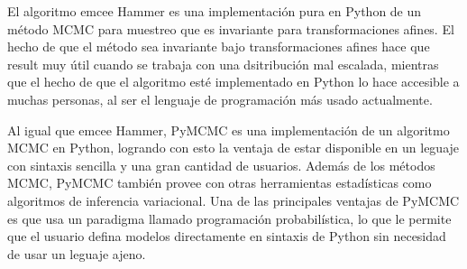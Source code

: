 \documentclass{article}
\begin{document}
\begin{enumerate}
    El algoritmo emcee Hammer es una implementación pura en Python de un método MCMC para 
    muestreo que es invariante para transformaciones afines. El hecho de que el método
    sea invariante bajo transformaciones afines hace que result muy útil cuando
    se trabaja con una dsitribución mal escalada, mientras que el hecho de que el
    algoritmo esté implementado en Python lo hace accesible a muchas personas, al ser
    el lenguaje de programación más usado actualmente.

    Al igual que emcee Hammer, PyMCMC es una implementación de un algoritmo MCMC en 
    Python, logrando con esto la ventaja de estar disponible en un leguaje con sintaxis
    sencilla y una gran cantidad de usuarios. Además de los métodos MCMC, PyMCMC también
    provee con otras herramientas estadísticas como algoritmos de inferencia variacional.
    Una de las principales ventajas de PyMCMC es que usa un paradigma llamado programación
    probabilística, lo que le permite que el usuario defina modelos directamente 
    en sintaxis de Python sin necesidad de usar un leguaje ajeno.


   
\end{enumerate}




 
\end{document}
